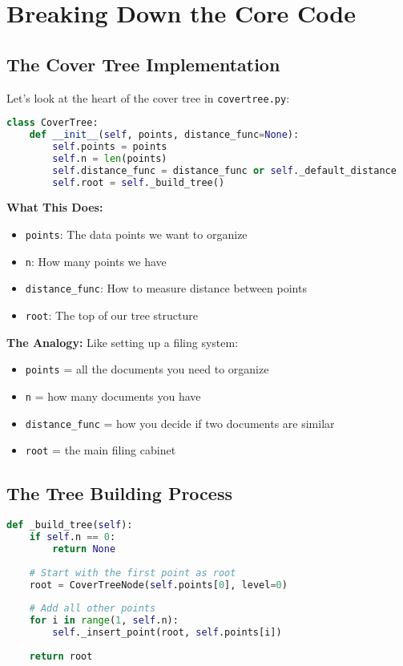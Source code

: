 \documentclass[12pt]{article}
\begin{document}
\section{Breaking Down the Core Code}

\subsection{The Cover Tree Implementation}

Let's look at the heart of the cover tree in \texttt{covertree.py}:

\begin{lstlisting}[language=Python, basicstyle=\small]
class CoverTree:
    def __init__(self, points, distance_func=None):
        self.points = points
        self.n = len(points)
        self.distance_func = distance_func or self._default_distance
        self.root = self._build_tree()
\end{lstlisting}

\textbf{What This Does:}
\begin{itemize}
    \item \texttt{points}: The data points we want to organize
    \item \texttt{n}: How many points we have
    \item \texttt{distance\_func}: How to measure distance between points
    \item \texttt{root}: The top of our tree structure
\end{itemize}

\textbf{The Analogy:} Like setting up a filing system:
\begin{itemize}
    \item \texttt{points} = all the documents you need to organize
    \item \texttt{n} = how many documents you have
    \item \texttt{distance\_func} = how you decide if two documents are similar
    \item \texttt{root} = the main filing cabinet
\end{itemize}

\subsection{The Tree Building Process}

\begin{lstlisting}[language=Python, basicstyle=\small]
def _build_tree(self):
    if self.n == 0:
        return None
    
    # Start with the first point as root
    root = CoverTreeNode(self.points[0], level=0)
    
    # Add all other points
    for i in range(1, self.n):
        self._insert_point(root, self.points[i])
    
    return root
\end{lstlisting}
\end{document}
